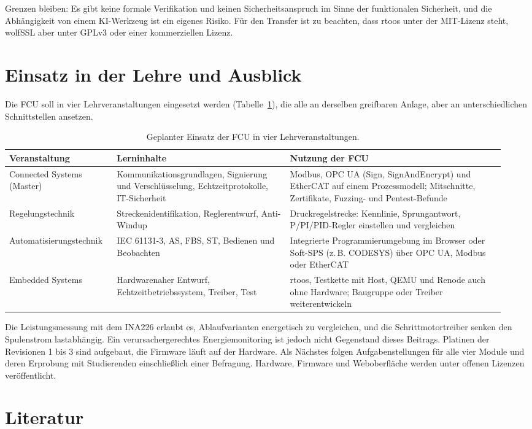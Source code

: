 \documentclass[]{article}
\begin{document}
Grenzen bleiben: Es gibt keine formale Verifikation und keinen Sicherheitsanspruch im Sinne der funktionalen Sicherheit, und die Abhängigkeit von einem KI-Werkzeug ist ein eigenes Risiko. Für den Transfer ist zu beachten, dass rtoos unter der MIT-Lizenz steht, wolfSSL aber unter GPLv3 oder einer kommerziellen Lizenz.

\section{Einsatz in der Lehre und Ausblick}\label{sec:lehre}

Die FCU soll in vier Lehrveranstaltungen eingesetzt werden (Tabelle~\ref{tab:lehre}), die alle an derselben greifbaren Anlage, aber an unterschiedlichen Schnittstellen ansetzen.

\begin{table}[htbp]
\centering
\small
\caption{Geplanter Einsatz der FCU in vier Lehrveranstaltungen.}
\label{tab:lehre}
\begin{tabular}{p{0.20\linewidth}p{0.33\linewidth}p{0.41\linewidth}}
\toprule
\textbf{Veranstaltung} & \textbf{Lerninhalte} & \textbf{Nutzung der FCU} \\
\midrule
Connected Systems (Master) & Kommunikationsgrundlagen, Signierung und Verschlüsselung, Echtzeitprotokolle, IT-Sicherheit & Modbus, OPC UA (Sign, SignAndEncrypt) und EtherCAT auf einem Prozessmodell; Mitschnitte, Zertifikate, Fuzzing- und Pentest-Befunde \\[2pt]
Regelungstechnik & Streckenidentifikation, Reglerentwurf, Anti-Windup & Druckregelstrecke: Kennlinie, Sprungantwort, P/PI/PID-Regler einstellen und vergleichen \\[2pt]
Automatisierungs\-technik & IEC 61131-3, AS, FBS, ST, Bedienen und Beobachten & Integrierte Programmierumgebung im Browser oder Soft-SPS (z.\,B. CODESYS) über OPC UA, Modbus oder EtherCAT \\[2pt]
Embedded Systems & Hardwarenaher Entwurf, Echtzeitbetriebssystem, Treiber, Test & rtoos, Testkette mit Host, QEMU und Renode auch ohne Hardware; Baugruppe oder Treiber weiterentwickeln \\[2pt]
\bottomrule
\end{tabular}
\end{table}

Die Leistungsmessung mit dem INA226 erlaubt es, Ablaufvarianten energetisch zu vergleichen, und die Schrittmotortreiber senken den Spulenstrom lastabhängig. Ein verursachergerechtes Energiemonitoring ist jedoch nicht Gegenstand dieses Beitrags. Platinen der Revisionen 1 bis 3 sind aufgebaut, die Firmware läuft auf der Hardware. Als Nächstes folgen Aufgabenstellungen für alle vier Module und deren Erprobung mit Studierenden einschließlich einer Befragung. Hardware, Firmware und Weboberfläche werden unter offenen Lizenzen veröffentlicht.

\section{Literatur}



\end{document}
